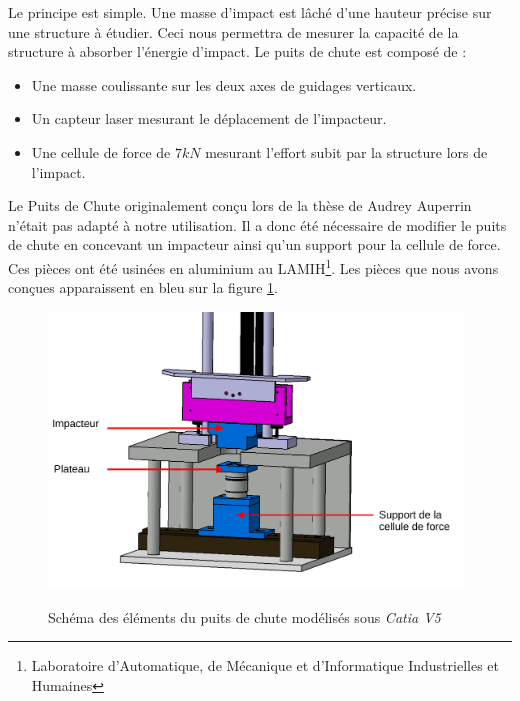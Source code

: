 \documentclass[a4paper]{article}
\begin{document}
	Le principe est simple. Une masse d'impact est lâché d’une hauteur précise sur une structure à étudier. Ceci nous permettra de mesurer la capacité de la structure à absorber l'énergie d'impact. Le puits de chute est composé de :
	
	\begin{itemize}
		\item Une masse coulissante sur les deux axes de guidages verticaux.
		\item Un capteur laser mesurant le déplacement de l'impacteur.
		\item Une cellule de force de $7 kN$ mesurant l'effort subit par la structure lors de l'impact.
	\end{itemize}

	Le Puits de Chute originalement conçu lors de la thèse de Audrey Auperrin \cite{these_auperrin} n'était pas adapté à notre utilisation. Il a donc été nécessaire de modifier le puits de chute en concevant un impacteur ainsi qu'un support pour la cellule de force. Ces pièces ont été usinées en aluminium au LAMIH\footnote{Laboratoire d'Automatique, de Mécanique et d'Informatique Industrielles et Humaines}. Les pièces que nous avons conçues apparaissent en bleu sur la figure \ref{pieces_pdc}.
	
	\begin{figure}[H]
		\centering
		\includegraphics[width=11cm]{Images/6/conception_finale.pdf}\\
		\caption{Schéma des éléments du puits de chute modélisés sous \textit{Catia V5}}
		\label{pieces_pdc}
	\end{figure}
	\newpage
	
\end{document}
